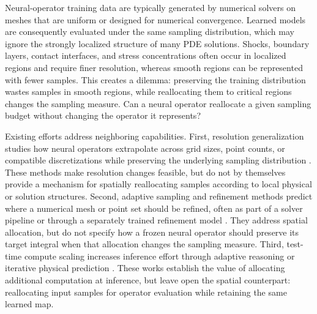 \documentclass{article}
\begin{document}
Neural-operator training data are typically generated by numerical solvers on meshes that are uniform or designed for numerical convergence. Learned models are consequently evaluated under the same sampling distribution, which may ignore the strongly localized structure of many PDE solutions. Shocks, boundary layers, contact interfaces, and stress concentrations often occur in localized regions and require finer resolution, whereas smooth regions can be represented with fewer samples. This creates a dilemma: preserving the training distribution wastes samples in smooth regions, while reallocating them to critical regions changes the sampling measure. Can a neural operator reallocate a given sampling budget without changing the operator it represents?


Existing efforts address neighboring capabilities. First, resolution
generalization studies how neural operators extrapolate across grid sizes,
point counts, or compatible discretizations while preserving the underlying
sampling distribution \citep{li2021fno,li2023gino,liu2023nuno,alkin2024upt,
zhou2026transolver3,gao2025discretization}. These methods make resolution
changes feasible, but do not by themselves provide a mechanism for spatially reallocating samples according to local physical or solution structures. Second, adaptive sampling and refinement
methods predict where a numerical mesh or point set should be refined, often
as part of a solver pipeline or through a separately trained refinement model
\citep{huang2021meshgeneration,obiols2023adarnet,rowbottom2024gadaptivity}.
They address spatial allocation, but do not specify how a frozen neural
operator should preserve its target integral when that allocation changes the
sampling measure. Third, test-time compute scaling increases inference effort
through adaptive reasoning or iterative physical prediction
\citep{snell2024scalingllmtesttime,lippe2023pderefiner,jenkins2026atca,
serrano2026splitting}. These works establish the value of allocating additional
computation at inference, but leave open the spatial counterpart: reallocating
input samples for operator evaluation while retaining the same learned map.
\end{document}
